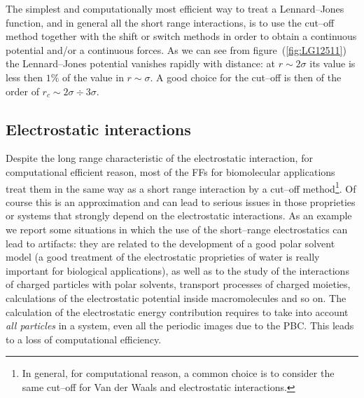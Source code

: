 The simplest and computationally most efficient way to treat a Lennard--Jones function, and in general all the 
short range interactions, is to use the cut--off method together with the shift or switch methods in order to 
obtain a continuous potential and/or a continuous forces. As we can see from figure~(\ref{fig:LG12511}) the 
Lennard--Jones potential vanishes rapidly with distance: at $r \sim 2\sigma$ its value is less then $1\%$ of the 
value in $r \sim \sigma$. A good choice for the cut--off is then of the order of $r_c \sim 2\sigma \div 3\sigma$.

\subsection{Electrostatic interactions}
\label{sec:longRangeInt}
Despite the long range characteristic of the electrostatic interaction, for computational efficient reason, most 
of the \acp{FF} for biomolecular applications treat them in the same way as a short range interaction by a 
cut--off method\footnote{In general, for computational reason, a common choice is to consider the same cut--off 
for Van der Waals and electrostatic interactions.}. Of course this is an approximation and can lead to serious 
issues in those proprieties or systems that strongly depend on the electrostatic interactions. As an example we 
report some situations in which the use of the short--range electrostatics can lead to artifacts: they are 
related to the development of a good polar solvent model (a good treatment of the electrostatic proprieties of 
water is really important for biological applications), as well as to the study of the interactions of charged 
particles with polar solvents, transport processes of charged moieties, calculations of the electrostatic 
potential inside macromolecules and so on. The calculation of the electrostatic energy contribution requires to 
take into account \textit{all particles} in a system, even all the periodic images due to the \ac{PBC}. This 
leads to a loss of computational efficiency.

